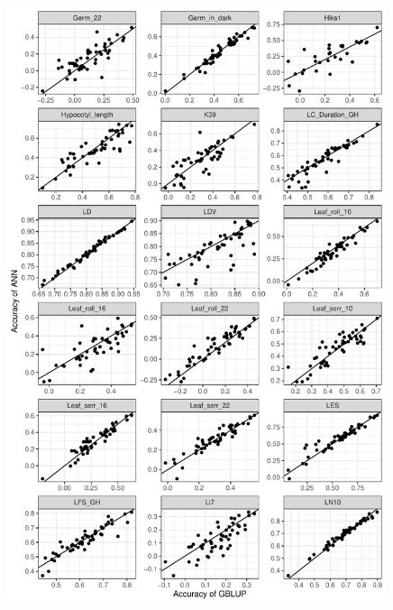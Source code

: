 \begin{figure}[H]
  \centering \includegraphics[height=0.99\textheight, width=0.99\textwidth]{Figures/gray_cor_plots_4}
  \decoRule
 \label{fig:bla}
\end{figure}


